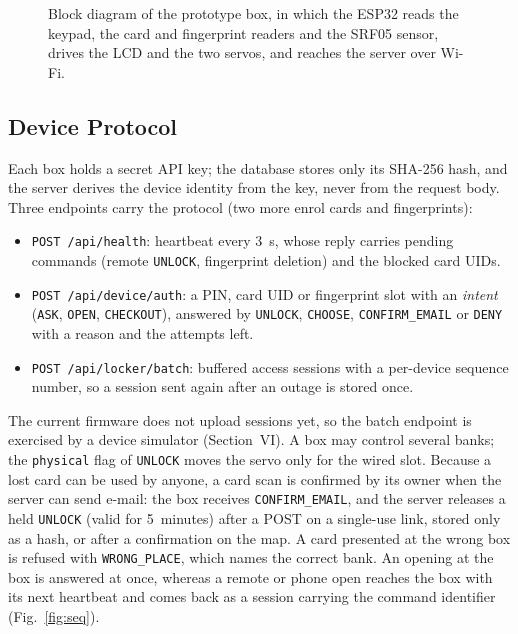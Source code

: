 \begin{figure}[!htbp]
\caption{Block diagram of the prototype box, in which the ESP32 reads the keypad, the card and fingerprint readers and
the SRF05 sensor, drives the LCD and the two servos, and reaches the server over Wi-Fi.}
\label{fig:block}
\end{figure}

\subsection{Device Protocol}

Each box holds a secret API key; the database stores only its SHA-256 hash, and the server derives the device
identity from the key, never from the request body. Three endpoints carry the protocol (two more enrol cards and
fingerprints):
\begin{itemize}
  \item \texttt{POST /api/health}: heartbeat every 3~s, whose reply carries pending commands (remote
        \texttt{UNLOCK}, fingerprint deletion) and the blocked card UIDs.
  \item \texttt{POST /api/device/auth}: a PIN, card UID or fingerprint slot with an \emph{intent} (\texttt{ASK},
        \texttt{OPEN}, \texttt{CHECKOUT}), answered by \texttt{UNLOCK}, \texttt{CHOOSE}, \texttt{CONFIRM\_EMAIL} or
        \texttt{DENY} with a reason and the attempts left.
  \item \texttt{POST /api/locker/batch}: buffered access sessions with a per-device sequence number, so a session sent
        again after an outage is stored once.
\end{itemize}
The current firmware does not upload sessions yet, so the batch endpoint is exercised by a device simulator
(Section~VI). A box may control several banks; the \texttt{physical} flag of \texttt{UNLOCK} moves the servo only for
the wired slot. Because a lost card can be used by anyone, a card scan is confirmed by its owner when the server can
send e-mail: the box receives \texttt{CONFIRM\_EMAIL}, and the server releases a held \texttt{UNLOCK} (valid for
5~minutes) after a POST on a single-use link, stored only as a hash, or after a confirmation on the map. A card
presented at the wrong box is refused with \texttt{WRONG\_PLACE}, which names the correct bank. An opening at the box
is answered at once, whereas a remote or phone open reaches the box with its next heartbeat and comes back as a session
carrying the command identifier (Fig.~\ref{fig:seq}).

